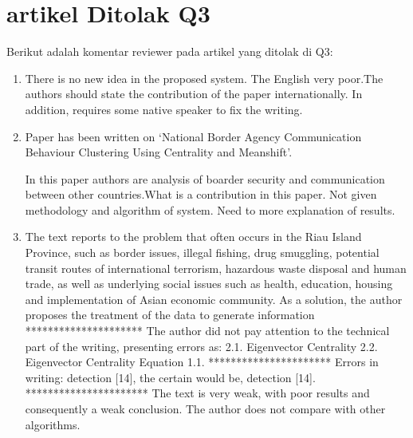 \section{artikel Ditolak Q3}
Berikut adalah komentar reviewer pada artikel yang ditolak di Q3:
\begin{enumerate}
	\item There is no new idea in the proposed system. The English very poor.The authors should state the contribution of the paper internationally. In addition, requires some native speaker to fix the writing.
	\item Paper has been written on `National Border Agency Communication Behaviour Clustering Using Centrality and Meanshift'. 

	In this paper authors are analysis of boarder security and communication between other countries.What is a contribution in this paper. Not given methodology and algorithm of system. Need to more explanation of results.
	\item The text reports to the problem that often occurs in the Riau Island Province, such as border issues, illegal fishing, drug smuggling, potential transit routes of international terrorism, hazardous waste disposal and human trade, as well as underlying social issues such as health, education, housing and implementation of Asian economic community. As a solution, the author proposes the treatment of the data to generate information
	*********************
	The author did not pay attention to the technical part of the writing, presenting errors as:
	2.1. Eigenvector Centrality 2.2. Eigenvector Centrality
	Equation 1.1.
	**********************
	Errors in writing: detection [14], the certain would be, detection [14].
	**********************
	The text is very weak, with poor results and consequently a weak conclusion. The author does not compare with other algorithms.
	
\end{enumerate}